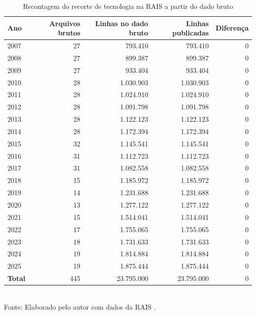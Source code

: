 \begin{table}[htbp]
    \centering
    \caption{Recontagem do recorte de tecnologia na RAIS a partir do dado bruto}
    \label{tab:reprodutibilidade-rais}
    \footnotesize
    \renewcommand{\arraystretch}{1.25}
    \begin{tabular}{lrrrr}
        \toprule
        \rowcolor{black!8}
        \textbf{Ano} & \textbf{Arquivos brutos} & \textbf{Linhas no dado bruto} & \textbf{Linhas publicadas} & \textbf{Diferença} \\
        \midrule
        2007 & 27 & 793.410 & 793.410 & 0 \\
        2008 & 27 & 899.387 & 899.387 & 0 \\
        2009 & 27 & 933.404 & 933.404 & 0 \\
        2010 & 28 & 1.030.903 & 1.030.903 & 0 \\
        2011 & 28 & 1.024.910 & 1.024.910 & 0 \\
        2012 & 28 & 1.091.798 & 1.091.798 & 0 \\
        2013 & 28 & 1.122.123 & 1.122.123 & 0 \\
        2014 & 28 & 1.172.394 & 1.172.394 & 0 \\
        2015 & 32 & 1.145.541 & 1.145.541 & 0 \\
        2016 & 31 & 1.112.723 & 1.112.723 & 0 \\
        2017 & 31 & 1.082.558 & 1.082.558 & 0 \\
        2018 & 15 & 1.185.972 & 1.185.972 & 0 \\
        2019 & 14 & 1.231.688 & 1.231.688 & 0 \\
        2020 & 13 & 1.277.122 & 1.277.122 & 0 \\
        2021 & 15 & 1.514.041 & 1.514.041 & 0 \\
        2022 & 17 & 1.755.065 & 1.755.065 & 0 \\
        2023 & 18 & 1.731.633 & 1.731.633 & 0 \\
        2024 & 19 & 1.814.884 & 1.814.884 & 0 \\
        2025 & 19 & 1.875.444 & 1.875.444 & 0 \\
        \textbf{Total} & 445 & 23.795.000 & 23.795.000 & 0 \\
        \bottomrule
    \end{tabular}
    \\[4pt]
    Fonte: Elaborado pelo autor com dados da RAIS \cite{RAIS2024}.
\end{table}
